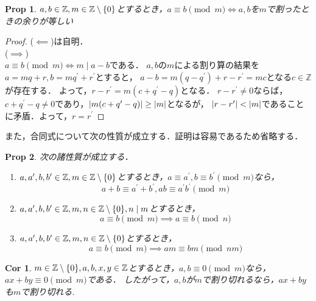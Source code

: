 \documentclass{jsarticle}
\DeclarePairedDelimiter{\abs}{\lvert}{\rvert} %
\DeclarePairedDelimiter{\cbra}{\lbrace}{\rbrace} %
\newtheorem{prop}{Prop}
\newtheorem{cor}{Cor}
\newcommand{\integer}{\mathbb{Z}}
\begin{document}
    \begin{prop}
      $a,b \in \integer, m \in \integer \setminus \cbra{0}$とするとき，$a \equiv b \pmod m \iff a,b$を$m$で割ったときの余りが等しい
    \end{prop}
    \begin{proof}
      ($\impliedby$)は自明．\\
      ($\implies$)\\
      $a \equiv b \pmod m \iff m \mid a-b$である．
      $a,b$の$m$による割り算の結果を$a=mq+r, b=mq^{\prime} + r^{\prime}$とすると，
      $a-b = m(q - q^{\prime})+ r - r^{\prime} = mc$となる$c \in \integer$が存在する．
      よって，$r-r^{\prime} = m(c + q^{\prime} - q)となる．$
      $r - r^{\prime} \neq 0$ならば，$c+q^{\prime} - q \neq 0$であり，$\abs{m(c + q^{\prime} - q)} \geq \abs{m}$となるが，
      $\abs{r-r^{\prime}} < \abs{m}$であることに矛盾．よって，$r = r^{\prime}$ 
    \end{proof}

    また，合同式について次の性質が成立する．証明は容易であるため省略する．
    
    \begin{prop}
      次の諸性質が成立する．
      \begin{enumerate}
        \item $a,a^{\prime}, b, b^{\prime} \in \integer, m \in \integer \setminus \cbra{0}$とするとき，$a \equiv a^{\prime}, b \equiv b^{\prime} \pmod m$なら，
          \begin{equation}
            a+b \equiv a^{\prime} + b^{\prime}, ab \equiv a^{\prime}b^{\prime} \pmod m \nonumber
          \end{equation}
        \item $a,a^{\prime}, b, b^{\prime} \in \integer, m, n \in \integer \setminus \cbra{0}, n \mid m$とするとき，
          \begin{equation}
            a \equiv b \pmod m \implies a \equiv b \pmod n \nonumber
          \end{equation}
        \item $a,a^{\prime}, b, b^{\prime} \in \integer, m, n \in \integer \setminus \cbra{0}$とするとき，
          \begin{equation}
            a \equiv b \pmod m \implies am \equiv bm \pmod {nm} \nonumber
          \end{equation}
      \end{enumerate}
    \end{prop}

    \begin{cor}
      $ m \in \integer \setminus \cbra{0}, a,b,x,y \in \integer$とするとき，$a,b \equiv 0 \pmod m$なら，
      $ax + by \equiv 0 \pmod m$である．
      したがって，$a,b$が$m$で割り切れるなら，$ax+by$も$m$で割り切れる.
    \end{cor}
\end{document}
